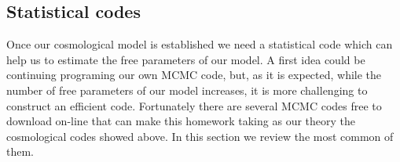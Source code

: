 \documentclass[onecolumn,           %
               showpacs,            %
               preprintnumbers,     %
               aps,                 %
               prl,          	    %
               letterpaper,             %
               superscriptaddress,      %
               nofootinbib,         %
               tightenlines,        %
               floats,floatfix      %
               ,usenatbib,
               ]{revtex4-1}
\begin{document}





\subsection{Statistical codes}

Once our cosmological model is established we need a statistical code which can help us to estimate the free parameters of our model. A first idea could be continuing programing our own MCMC code, but, as it is expected, while the number of free parameters of our model increases, it is more challenging to construct an efficient code. Fortunately there are several MCMC codes free to download on-line that can make this homework taking as our theory the cosmological codes showed above. In this section we review the most common of them.
\end{document}
